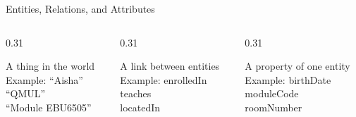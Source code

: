 \documentclass[aspectratio=169]{beamer}
\newcommand{\defaultdeckrefs}{AIMA4e Ch.10 pp.314--343; Poole3e Ch.16 pp.701--730}
\newcommand{\currentsliderefs}{\defaultdeckrefs}
\newcommand{\setslideref}[1]{\gdef\currentsliderefs{#1}}
\begin{document}
\setslideref{AIMA4e Ch.10 pp.314--343; Poole3e Ch.16 pp.701--730}
\begin{frame}{Entities, Relations, and Attributes}
\begin{columns}[T,onlytextwidth]
  \begin{column}{0.31\textwidth}
    \begin{tcolorbox}[colback=questionbg,colframe=questionframe,boxrule=0.7pt,title=Entity]
    A thing in the world\\
    Example: ``Aisha''\\``QMUL''\\``Module EBU6505''
    \end{tcolorbox}
  \end{column}
  \begin{column}{0.31\textwidth}
    \begin{tcolorbox}[colback=plainbg,colframe=plainframe,boxrule=0.7pt,title=Relation]
    A link between entities\\
    Example: enrolledIn\\teaches\\locatedIn
    \end{tcolorbox}
  \end{column}
  \begin{column}{0.31\textwidth}
    \begin{tcolorbox}[colback=notationbg,colframe=notationframe,boxrule=0.7pt,title=Attribute]
    A property of one entity\\
    Example: birthDate\\moduleCode\\roomNumber
    \end{tcolorbox}
  \end{column}
\end{columns}
\end{frame}
\end{document}
